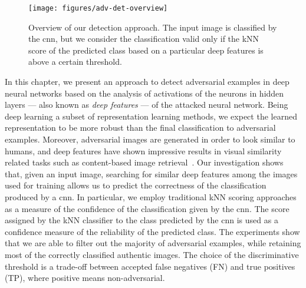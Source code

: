 \begin{figure}
\centering
\texttt{[image: figures/adv-det-overview]}
\caption{Overview of our detection approach.
The input image is classified by the \gls{cnn}, but we consider the classification valid only if the kNN score of the predicted class based on a particular deep features is above a certain threshold.}
\label{fig:adv:overview}
\end{figure}

In this chapter, we present an approach to detect adversarial examples in deep neural networks based on the analysis of activations of the neurons in hidden layers --- also known as \emph{deep features} --- of the attacked neural network.
Being deep learning a subset of representation learning methods, we expect the learned representation to be more robust than the final classification to adversarial examples.
Moreover, adversarial images are generated in order to look similar to humans, and deep features have shown impressive results in visual similarity related tasks such as content-based image retrieval~\cite{sharif2014cnn,gordo2016deep}.
Our investigation shows that, given an input image, searching for similar deep features among the images used for training allows us to predict the correctness of the classification produced by a \gls{cnn}.
In particular, we employ traditional kNN scoring approaches as a measure of the confidence of the classification given by the \gls{cnn}.
The score assigned by the kNN classifier to the class predicted by the \gls{cnn} is used as a confidence measure of the reliability of the predicted class.
The experiments show that we are able to filter out the majority of adversarial examples, while retaining most of the correctly classified authentic images.
The choice of the discriminative threshold is a trade-off between accepted false negatives (FN) and true positives (TP), where positive means non-adversarial.
%

